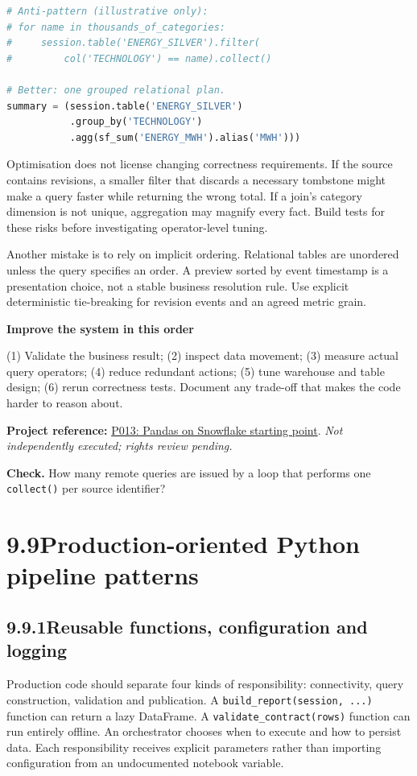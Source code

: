 \documentclass[11pt,twoside]{article}
\newcommand{\topic}[2]{\subsection*{#1\quad #2}}
\newcommand{\repo}[2]{\par\begingroup\fontsize{8.0}{9.6}\selectfont\sffamily\color{inkgray}\textbf{Project reference:} \href{#2}{#1}. \textit{Not independently executed; rights review pending.}\par\endgroup}
\begin{document}
\begin{lstlisting}[language=Python,caption={Avoid a query for every energy category.}]
# Anti-pattern (illustrative only):
# for name in thousands_of_categories:
#     session.table('ENERGY_SILVER').filter(
#         col('TECHNOLOGY') == name).collect()

# Better: one grouped relational plan.
summary = (session.table('ENERGY_SILVER')
           .group_by('TECHNOLOGY')
           .agg(sf_sum('ENERGY_MWH').alias('MWH')))
\end{lstlisting}
Optimisation does not license changing correctness requirements. If the source contains revisions, a smaller filter that discards a necessary tombstone might make a query faster while returning the wrong total. If a join's category dimension is not unique, aggregation may magnify every fact. Build tests for these risks before investigating operator-level tuning.

Another mistake is to rely on implicit ordering. Relational tables are unordered unless the query specifies an order. A preview sorted by event timestamp is a presentation choice, not a stable business resolution rule. Use explicit deterministic tie-breaking for revision events and an agreed metric grain.
\begin{whitebox}\textbf{Improve the system in this order}\par
(1) Validate the business result; (2) inspect data movement; (3) measure actual query operators; (4) reduce redundant actions; (5) tune warehouse and table design; (6) rerun correctness tests. Document any trade-off that makes the code harder to reason about.\end{whitebox}
\repo{P013: Pandas on Snowflake starting point}{https://github.com/Snowflake-Labs/sfguide-getting-started-with-pandas-on-snowflake}
\textbf{Check.} How many remote queries are issued by a loop that performs one \texttt{collect()} per source identifier?
\newpage
\section*{9.9\quad Production-oriented Python pipeline patterns}
\topic{9.9.1}{Reusable functions, configuration and logging}
Production code should separate four kinds of responsibility: connectivity, query construction, validation and publication. A \texttt{build\_report(session, ...)} function can return a lazy DataFrame. A \texttt{validate\_contract(rows)} function can run entirely offline. An orchestrator chooses when to execute and how to persist data. Each responsibility receives explicit parameters rather than importing configuration from an undocumented notebook variable.
\end{document}
